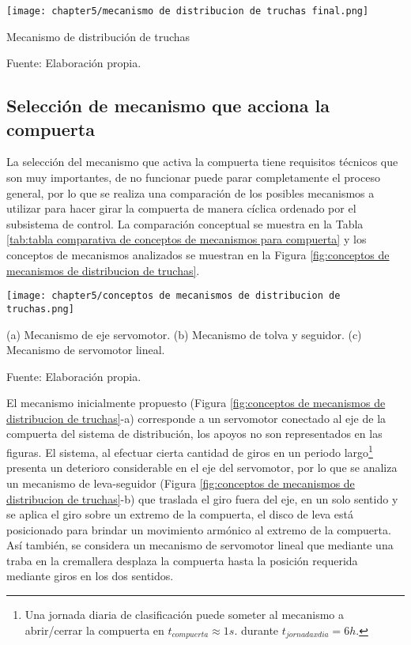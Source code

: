 \begin{myfigure}[H]
	\footnotesize\centering
	\texttt{[image: chapter5/mecanismo de distribucion de truchas final.png]}
	\caption{Mecanismo de distribución de truchas}
	\begin{myflushcenter}
		Fuente: Elaboración propia.
	\end{myflushcenter}
	\label{fig:mecanismo de distribucion de truchas}
\end{myfigure}

\subsection{Selección de mecanismo que acciona la compuerta}
	
La selección del mecanismo que activa la compuerta tiene requisitos técnicos que son muy importantes, de no funcionar puede parar completamente el proceso general, por lo que se realiza una comparación de los posibles mecanismos a utilizar para hacer girar la compuerta de manera cíclica ordenado por el subsistema de control. La comparación conceptual se muestra en la Tabla \ref{tab:tabla comparativa de conceptos de mecanismos para compuerta} y los conceptos de mecanismos analizados se muestran en la Figura \ref{fig:conceptos de mecanismos de distribucion de truchas}.
	
\begin{myfigure}[H]
	\footnotesize\centering
	\texttt{[image: chapter5/conceptos de mecanismos de distribucion de truchas.png]}
	\caption[Conceptos de mecanismos de distribución de truchas]{(a) Mecanismo de eje servomotor. (b) Mecanismo de tolva y seguidor. (c) Mecanismo de servomotor lineal.}
	\begin{myflushcenter}
		Fuente: Elaboración propia.
	\end{myflushcenter}
	\label{fig:conceptos de mecanismos de distribucion de truchas}
\end{myfigure}
	
El mecanismo inicialmente propuesto (Figura \ref{fig:conceptos de mecanismos de distribucion de truchas}-a) corresponde a un servomotor conectado al eje de la compuerta del sistema de distribución, los apoyos no son representados en las figuras. El sistema, al efectuar cierta cantidad de giros en un periodo largo\footnote{Una jornada diaria de clasificación puede someter al mecanismo a abrir/cerrar la compuerta en $t_{compuerta}\approx1 s.$ durante $t_{jornadaxdia}=6 h.$} presenta un deterioro considerable en el eje del servomotor, por lo que se analiza un mecanismo de leva-seguidor (Figura \ref{fig:conceptos de mecanismos de distribucion de truchas}-b) que traslada el giro fuera del eje, en un solo sentido y se aplica el giro sobre un extremo de la compuerta, el disco de leva está posicionado para brindar un movimiento armónico al extremo de la compuerta. Así también, se considera un mecanismo de servomotor lineal que mediante una traba en la cremallera desplaza la compuerta hasta la posición requerida mediante giros en los dos sentidos.

